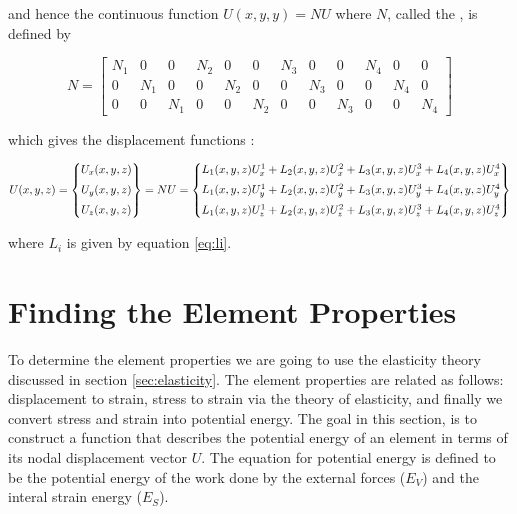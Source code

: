 and hence the continuous function $U(x,y,y) = N U$ where $N$, called the
, is defined by

\begin{equation}
\label{eq:interpolation_matrix}
N = \left[
\begin{array}{cccccccccccc}
N_1 & 0 & 0 & N_2 & 0 & 0 & N_3 & 0 & 0 & N_4 & 0 & 0 \\
0 & N_1 & 0 & 0 & N_2 & 0 & 0 & N_3 & 0 & 0 & N_4 & 0 \\
0 & 0 & N_1 & 0 & 0 & N_2 & 0 & 0 & N_3 & 0 & 0 & N_4
\end{array}
\right]
\end{equation}

which gives the displacement functions
:

\begin{equation}
U(x,y,z) =
\begin{Bmatrix}
U_x(x,y,z) 
\vspace{2mm} \\
U_y(x,y,z) 
\vspace{2mm} \\
U_z(x,y,z)
\end{Bmatrix}
= N U =
\begin{Bmatrix}
  L_1(x,y,z) U_x^{1} + L_2(x,y,z) U_x^{2}
  + L_3(x,y,z) U_x^{3} + L_4(x,y,z) U_x^{4}
\vspace{2mm}\\
  L_1(x,y,z) U_y^{1} + L_2(x,y,z) U_y^{2}
  + L_3(x,y,z) U_y^{3} + L_4(x,y,z) U_y^{4} 
\vspace{2mm}\\
  L_1(x,y,z) U_z^{1} + L_2(x,y,z) U_z^{2} 
  + L_3(x,y,z) U_z^{3} + L_4(x,y,z) U_z^{4}
\end{Bmatrix}
\end{equation}

where $L_i$ is given by equation \eqref{eq:li}.

\section{Finding the Element Properties}
%
To determine the element properties we are going to use the elasticity
theory discussed in section \vref{sec:elasticity}. The element
properties are related as follows:
displacement to strain, stress to strain via the theory of
elasticity, and finally we convert stress and strain into potential
energy. The goal in this section, is to construct a function
that describes the potential energy of an element in terms of its nodal
displacement vector $U$. The equation for potential energy is defined
to be the potential energy of the work done by the external forces
($E_V$) and the interal strain energy ($E_S$).

